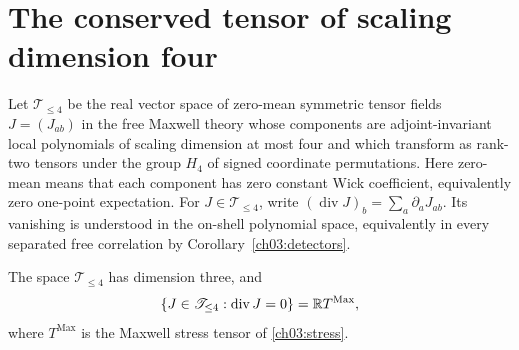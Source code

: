 \section{The conserved tensor of scaling dimension four}\label{ch03:classification}

Let $\mathscr T_{\le 4}$ be the real vector space of zero-mean symmetric
tensor fields $J=(J_{ab})$ in the free Maxwell theory whose components
are adjoint-invariant local polynomials of scaling dimension at most four
and which transform as rank-two tensors under the group $H_4$ of signed
coordinate permutations. Here zero-mean means that each component has zero
constant Wick coefficient, equivalently zero one-point expectation.
For $J\in\mathscr T_{\le 4}$, write
$(\operatorname{div}J)_b=\sum_a\partial_a J_{ab}$. Its vanishing is
understood in the on-shell polynomial space, equivalently in every
separated free correlation by Corollary~\ref{ch03:detectors}.

\begin{proposition}\label{ch03:stress-line}
The space $\mathscr T_{\le 4}$ has dimension three, and
\[
 \{J\in\mathscr T_{\le 4}:\operatorname{div}J=0\}
 =\mathbb R T^{\mathrm{Max}},
\]
where $T^{\mathrm{Max}}$ is the Maxwell stress tensor of \eqref{ch03:stress}.
\end{proposition}

